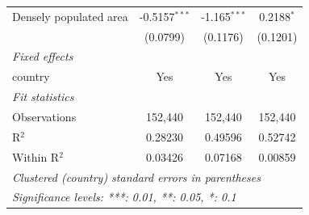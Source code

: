 \begin{tabular}{lccc}
   Densely populated area & -0.5157$^{***}$ & -1.165$^{***}$  & 0.2188$^{*}$\\   
                          & (0.0799)        & (0.1176)        & (0.1201)\\   
   \midrule
   \emph{Fixed effects}\\
   country                & Yes             & Yes             & Yes\\  
   \midrule
   \emph{Fit statistics}\\
   Observations           & 152,440         & 152,440         & 152,440\\  
   R$^2$                  & 0.28230         & 0.49596         & 0.52742\\  
   Within R$^2$           & 0.03426         & 0.07168         & 0.00859\\  
   \midrule \midrule
   \multicolumn{4}{l}{\emph{Clustered (country) standard errors in parentheses}}\\
   \multicolumn{4}{l}{\emph{Significance levels: ***: 0.01, **: 0.05, *: 0.1}}\\
\end{tabular}
\par\endgroup


